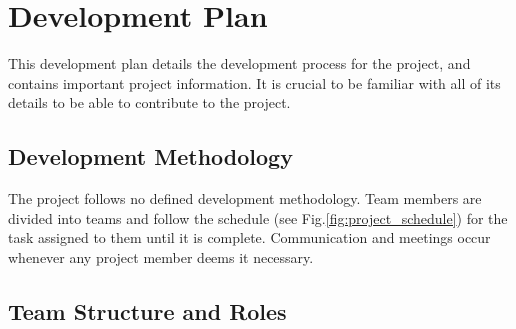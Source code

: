 \section{Development Plan}
\label{section:development_plan}

This development plan details the development process for the project, and contains important project information. It is crucial to be familiar with all of its details to be able to contribute to the project.



\subsection{Development Methodology}

The project follows no defined development methodology. Team members are divided into teams and follow the schedule (see Fig.\:\ref{fig:project_schedule}) for the task assigned to them until it is complete. Communication and meetings occur whenever any project member deems it necessary.



\subsection{Team Structure and Roles}

